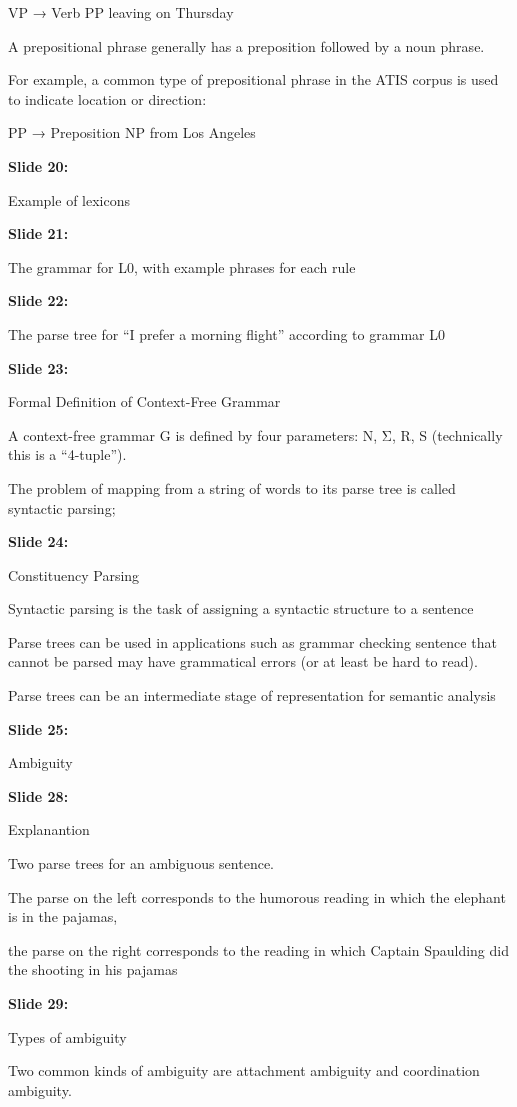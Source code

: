 \documentclass[11pt,a4paper]{article}
\begin{document}
VP → Verb PP          leaving on Thursday

A prepositional phrase generally has a preposition followed by a noun phrase.

For example, a common type of prepositional phrase in the ATIS corpus is used to indicate location or direction:

PP → Preposition NP     from Los Angeles

\textbf{Slide 20:}

Example of lexicons

\textbf{Slide 21:}

The grammar for L0, with example phrases for each rule

\textbf{Slide 22:}

The parse tree for “I prefer a morning flight” according to grammar L0

\textbf{Slide 23:}

Formal Definition of Context-Free Grammar

A context-free grammar G is defined by four parameters: N, Σ, R, S (technically this is a “4-tuple”).

The problem of mapping from a string of words to its parse tree is called syntactic parsing;

\textbf{Slide 24:}

Constituency Parsing

Syntactic parsing is the task of assigning a syntactic structure to a sentence

Parse trees can be used in applications such as grammar checking sentence that cannot be parsed may have grammatical errors (or at least be hard to read).

Parse trees can be an intermediate stage of representation for semantic analysis

\textbf{Slide 25:}

Ambiguity

\textbf{Slide 28:}

Explanantion

Two parse trees for an ambiguous sentence.

The parse on the left corresponds to the humorous reading in which the elephant is in the pajamas,

the parse on the right corresponds to the reading in which Captain Spaulding did the shooting in his pajamas

\textbf{Slide 29:}

Types of ambiguity

Two common  kinds of ambiguity are attachment ambiguity and coordination ambiguity.
\end{document}
